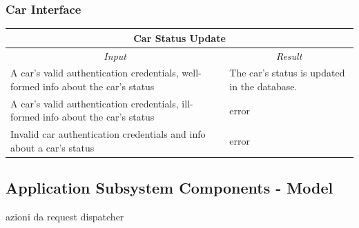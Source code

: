 \documentclass[english]{article}
\begin{document}
\subsubsection{Car Interface}
\begin{center}

	\begin{tabular}{ | p{6cm} | p{6cm} | }
		\hline 
		\multicolumn{2}{|c|}{\textbf{Car Status Update}} \\
		\hline
		\multicolumn{1}{|c|}{\textit{Input}} & \multicolumn{1}{c|}{\textit{Result}} \\
		\hline
		A car's valid authentication credentials, well-formed info about the car's status & The car's status is updated in the database. \\
		\hline
		A car's valid authentication credentials, ill-formed info about the car's status & error \\
		\hline
		Invalid car authentication credentials and info about a car's status  & error \\
		\hline
	\end{tabular}
\end{center}

\subsection{Application Subsystem Components - Model}
azioni da request dispatcher
\end{document}
